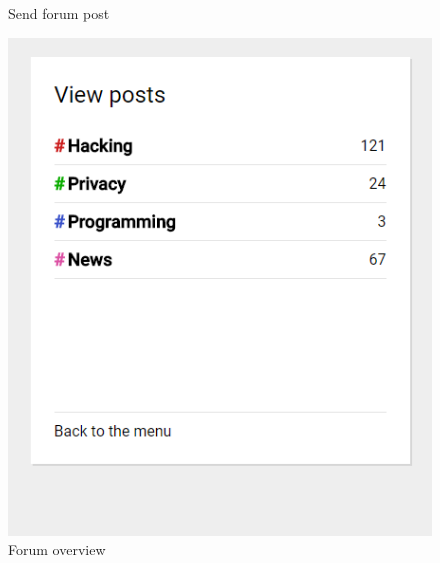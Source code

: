 \begin{table}[H]
\begin{minipage}{.33\textwidth}
\begin{figure}[H]
            \caption{Send forum post}
            \label{fig:prototype3}
        \end{figure}
    \end{minipage}
    \begin{minipage}{.33\textwidth}
        \begin{figure}[H]
            \centering
            \includegraphics[width=0.95\linewidth]{InteraktionsDesign/Assets/Prototype/4.png}
            \caption{Forum overview}
            \label{fig:prototype4}
        \end{figure}
    \end{minipage}
    \begin{minipage}{.33\textwidth}
        \begin{figure}[H]
            \centering

\end{figure}
\end{minipage}
\end{table}
